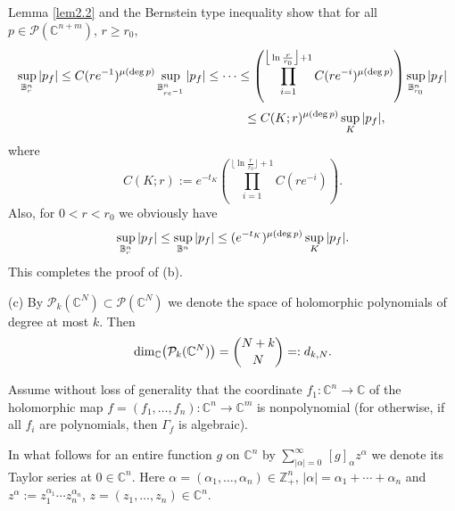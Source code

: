 \documentclass[11pt, oneside]{amsart}
\begin{document}
Lemma \ref{lem2.2}  and the Bernstein type inequality show that for all $p\in\mathcal P(\mathbb C^{n+m})$, $r\ge r_0$,
\[
\begin{array}{r}
\displaystyle
\sup_{\mathbb B_{r}^n}|p_f|\le C(re^{-1})^{\mu({\rm deg}\,p)}\sup_{\mathbb B_{re^{-1}}^n}|p_f|\le\cdots\le \left(\prod_{i=1}^{\big\lfloor\ln\frac{r}{r_0}\big\rfloor+1} C(re^{-i})^{\mu({\rm deg}\,p)}\right)\sup_{\mathbb B_{r_0}^n}|p_f|\medskip\\
\displaystyle \le
C(K;r)^{\mu({\rm deg}\,p)}\sup_{K}|p_f|,\qquad\qquad\ \ \
\end{array}
\]
where
\[
C(K;r):=e^{-t_K}\left(\prod_{i=1}^{\big\lfloor\ln\frac{r}{r_0}\big\rfloor+1} C(re^{-i})\right).
\]
Also, for $0<r<r_0$ we obviously have
\[
\sup_{\mathbb B_{r}^n}|p_f|\le\sup_{\mathbb B^n}|p_f|\le
(e^{-t_K})^{\mu({\rm deg}\,p)}\sup_{K}|p_f|.
\]
This completes the proof of (b).
\smallskip

(c) By $\mathcal P_k (\mathbb C^{N})\subset \mathcal P (\mathbb C^{N})$ we denote the space of holomorphic polynomials of degree at most $k$. Then
\[
{\rm dim}_{\mathbb C}\bigl(\mathcal P_k (\mathbb C^{N})\bigr)={ N+k \choose N}=:d_{k,N}.
\]

Assume without loss of generality that the coordinate $f_1:\mathbb C^n\rightarrow\mathbb C$ of the holomorphic map $f=(f_1,\dots, f_n):\mathbb C^n\rightarrow\mathbb C^m$ is nonpolynomial  (for otherwise, if all $f_i$ are polynomials, then $\Gamma_f$ is algebraic). 

In what follows for an entire function $g$ on $\mathbb C^n$ by
$
\sum_{|\alpha|=0}^\infty\, [g]_\alpha z^\alpha$
we denote its Taylor series at $0\in\mathbb C^n$. Here $\alpha=(\alpha_1,\dots,\alpha_n)\in\mathbb Z_+^n$, $|\alpha|=\alpha_1+\cdots +\alpha_n$  and $z^\alpha:=z_1^{\alpha_1}\cdots z_n^{\alpha_n}$, $z=(z_1,\dots, z_n)\in\mathbb C^n$. 
\end{document}
